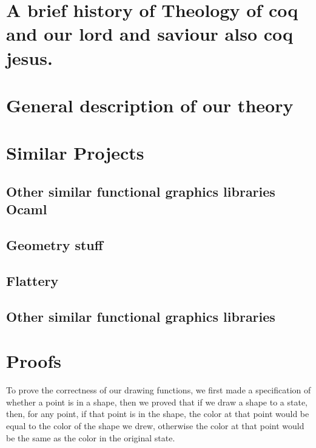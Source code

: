 \documentclass{llncs}
\begin{document}









\section{A brief history of Theology of coq and our lord and saviour also coq jesus.}

\section{General description of our theory}
\section{Similar Projects}
\subsection{Other similar functional graphics libraries Ocaml}
\subsection{Geometry stuff}

\subsection{Flattery}

\subsection{Other similar functional graphics libraries} 





\section{Proofs}
To prove the correctness of our drawing functions, we first made a specification of whether a point is in a shape, then we proved that if we draw a shape to a state, then, for any point, if that point is in the shape, the color at that point would be equal to the color of the shape we drew, otherwise the color at that point would be the same as the color in the original state.
\end{document}
